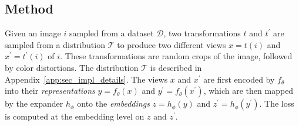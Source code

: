 \documentclass{article} %
\begin{document}
\subsection{Method} \label{sec:method_details}

Given an image $i$ sampled from a dataset $\mathcal{D}$, two transformations $t$ and $t^{\prime}$ are sampled from a distribution $\mathcal{T}$ to produce two different views $x = t(i)$ and $x^{\prime} = t^{\prime}(i)$ of $i$. These transformations are random crops of the image, followed by color distortions. The distribution $\mathcal{T}$ is described in Appendix~\ref{app:sec_impl_details}. The views $x$ and $x^{\prime}$ are first encoded by $f_{\theta}$ into their {\em representations} $y = f_{\theta}(x)$ and $y^{\prime} = f_{\theta}(x^{\prime})$, which are then mapped by the expander $h_{\phi}$ onto the {\em embeddings} $z = h_{\phi}(y)$ and $z^{\prime} = h_{\phi}(y^{\prime})$. The loss is computed at the embedding level on $z$ and $z^{\prime}$.
\end{document}
